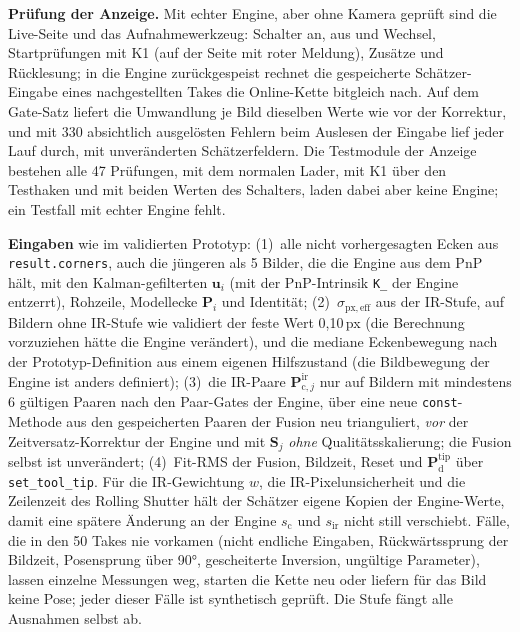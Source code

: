 \documentclass[11pt,a4paper,fleqn]{article}
\newcommand{\Ptd}{\mathbf{P}^{\mathrm{tip}}_{\mathrm{d}}}
\newcommand{\Pir}{\mathbf{P}^{\mathrm{ir}}_{\mathrm{c},j}}
\newcommand{\spx}{\sigma_{\mathrm{px,eff}}}
\newcommand{\code}[1]{\texttt{#1}}
\begin{document}
\textbf{Prüfung der Anzeige.} Mit echter Engine, aber ohne Kamera geprüft sind die Live-Seite und das
Aufnahmewerkzeug: Schalter an, aus und Wechsel, Startprüfungen mit K1 (auf der Seite mit roter Meldung), Zusätze und Rücklesung; in
die Engine zurückgespeist rechnet die gespeicherte Schätzer-Eingabe eines nachgestellten Takes die Online-Kette
bitgleich nach. Auf dem Gate-Satz liefert die Umwandlung je Bild dieselben Werte wie vor der Korrektur, und mit 330
absichtlich ausgelösten Fehlern beim Auslesen der Eingabe lief jeder Lauf durch, mit unveränderten Schätzerfeldern.
Die Testmodule der Anzeige bestehen alle 47 Prüfungen, mit dem normalen Lader, mit K1 über den Testhaken und mit
beiden Werten des Schalters, laden dabei aber keine Engine; ein Testfall mit echter Engine fehlt.

\textbf{Eingaben} wie im validierten Prototyp: (1)~alle nicht vorhergesagten Ecken aus \code{result.corners}, auch
die jüngeren als 5 Bilder, die die Engine aus dem PnP hält, mit den Kalman-gefilterten $\mathbf{u}_i$ (mit der
PnP-Intrinsik \code{K\_} der Engine entzerrt), Rohzeile, Modellecke $\mathbf{P}_i$ und Identität; (2)~$\spx$ aus der
IR-Stufe, auf Bildern ohne IR-Stufe wie validiert der feste Wert 0,10\,px (die Berechnung vorzuziehen hätte die
Engine verändert), und die mediane Eckenbewegung nach der Prototyp-Definition aus einem eigenen Hilfszustand (die
Bildbewegung der Engine ist anders definiert); (3)~die IR-Paare $\Pir$ nur auf Bildern mit mindestens 6 gültigen
Paaren nach den Paar-Gates der Engine, über eine neue \code{const}-Methode aus den gespeicherten Paaren der Fusion
neu trianguliert, \emph{vor} der Zeitversatz-Korrektur der Engine und mit $\mathbf{S}_j$ \emph{ohne}
Qualitätsskalierung; die Fusion selbst ist unverändert; (4)~Fit-RMS der Fusion, Bildzeit, Reset und $\Ptd$ über
\code{set\_tool\_tip}. Für die IR-Gewichtung $w$, die IR-Pixelunsicherheit und die Zeilenzeit des Rolling Shutter
hält der Schätzer eigene Kopien der Engine-Werte, damit eine spätere Änderung an der Engine $s_{\mathrm{c}}$ und
$s_{\mathrm{ir}}$ nicht still verschiebt. Fälle, die in den 50 Takes nie vorkamen (nicht endliche Eingaben,
Rückwärtssprung der Bildzeit, Posensprung über 90°, gescheiterte Inversion, ungültige Parameter), lassen einzelne
Messungen weg, starten die Kette neu oder liefern für das Bild keine Pose; jeder dieser Fälle ist synthetisch
geprüft. Die Stufe fängt alle Ausnahmen selbst ab.
\end{document}
